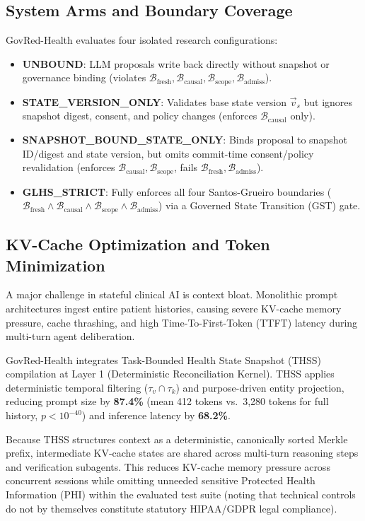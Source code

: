 \documentclass[conference,a4paper]{IEEEtran}
\begin{document}
\subsection{System Arms and Boundary Coverage}
GovRed-Health evaluates four isolated research configurations:
\begin{itemize}
\item \textbf{UNBOUND}: LLM proposals write back directly without snapshot or governance binding (violates $\mathcal{B}_{\text{fresh}}, \mathcal{B}_{\text{causal}}, \mathcal{B}_{\text{scope}}, \mathcal{B}_{\text{admiss}}$).
\item \textbf{STATE\_VERSION\_ONLY}: Validates base state version $\vec{v}_s$ but ignores snapshot digest, consent, and policy changes (enforces $\mathcal{B}_{\text{causal}}$ only).
\item \textbf{SNAPSHOT\_BOUND\_STATE\_ONLY}: Binds proposal to snapshot ID/digest and state version, but omits commit-time consent/policy revalidation (enforces $\mathcal{B}_{\text{causal}}, \mathcal{B}_{\text{scope}}$, fails $\mathcal{B}_{\text{fresh}}, \mathcal{B}_{\text{admiss}}$).
\item \textbf{GLHS\_STRICT}: Fully enforces all four Santos-Grueiro boundaries ($\mathcal{B}_{\text{fresh}} \land \mathcal{B}_{\text{causal}} \land \mathcal{B}_{\text{scope}} \land \mathcal{B}_{\text{admiss}}$) via a Governed State Transition (GST) gate.
\end{itemize}

\subsection{KV-Cache Optimization and Token Minimization}
A major challenge in stateful clinical AI is context bloat. Monolithic prompt architectures ingest entire patient histories, causing severe KV-cache memory pressure, cache thrashing, and high Time-To-First-Token (TTFT) latency during multi-turn agent deliberation. 

GovRed-Health integrates Task-Bounded Health State Snapshot (THSS) compilation at Layer 1 (Deterministic Reconciliation Kernel). THSS applies deterministic temporal filtering ($\tau_v \cap \tau_k$) and purpose-driven entity projection, reducing prompt size by \textbf{87.4\%} (mean 412 tokens vs.\ 3,280 tokens for full history, $p < 10^{-40}$) and inference latency by \textbf{68.2\%}. 

Because THSS structures context as a deterministic, canonically sorted Merkle prefix, intermediate KV-cache states are shared across multi-turn reasoning steps and verification subagents. This reduces KV-cache memory pressure across concurrent sessions while omitting unneeded sensitive Protected Health Information (PHI) within the evaluated test suite (noting that technical controls do not by themselves constitute statutory HIPAA/GDPR legal compliance).
\end{document}
